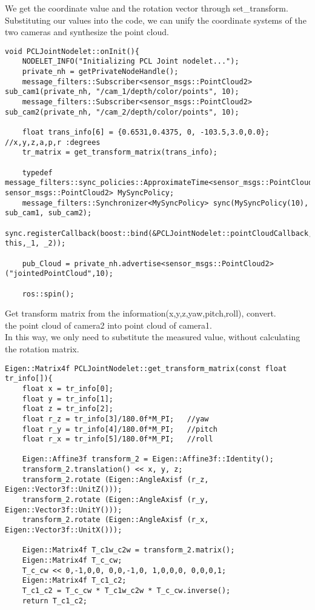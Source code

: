 We get the coordinate value and the rotation vector through set\_transform. Substituting our values into the code, we can unify the coordinate systems of the two cameras and synthesize the point cloud.
\begin{lstlisting}[caption={}]
void PCLJointNodelet::onInit(){
	NODELET_INFO("Initializing PCL Joint nodelet...");
	private_nh = getPrivateNodeHandle();
	message_filters::Subscriber<sensor_msgs::PointCloud2> sub_cam1(private_nh, "/cam_1/depth/color/points", 10);
	message_filters::Subscriber<sensor_msgs::PointCloud2> sub_cam2(private_nh, "/cam_2/depth/color/points", 10);
	
	float trans_info[6] = {0.6531,0.4375, 0, -103.5,3.0,0.0};  //x,y,z,a,p,r :degrees
	tr_matrix = get_transform_matrix(trans_info);
	
	typedef message_filters::sync_policies::ApproximateTime<sensor_msgs::PointCloud2, sensor_msgs::PointCloud2> MySyncPolicy;
	message_filters::Synchronizer<MySyncPolicy> sync(MySyncPolicy(10), sub_cam1, sub_cam2);
	sync.registerCallback(boost::bind(&PCLJointNodelet::pointCloudCallback, this,_1, _2));
	
	pub_Cloud = private_nh.advertise<sensor_msgs::PointCloud2>("jointedPointCloud",10);
	
	ros::spin();
\end{lstlisting}

Get transform matrix from the information(x,y,z,yaw,pitch,roll), convert.\\
the point cloud of camera2 into point cloud of camera1.\\
In this way, we only need to substitute the measured value, without calculating the rotation matrix.\\

\begin{lstlisting}[caption={}]
Eigen::Matrix4f PCLJointNodelet::get_transform_matrix(const float tr_info[]){
	float x = tr_info[0];
	float y = tr_info[1];
	float z = tr_info[2];
	float r_z = tr_info[3]/180.0f*M_PI;   //yaw
	float r_y = tr_info[4]/180.0f*M_PI;   //pitch
	float r_x = tr_info[5]/180.0f*M_PI;   //roll
	
	Eigen::Affine3f transform_2 = Eigen::Affine3f::Identity();
	transform_2.translation() << x, y, z;
	transform_2.rotate (Eigen::AngleAxisf (r_z, Eigen::Vector3f::UnitZ()));
	transform_2.rotate (Eigen::AngleAxisf (r_y, Eigen::Vector3f::UnitY()));
	transform_2.rotate (Eigen::AngleAxisf (r_x, Eigen::Vector3f::UnitX()));
	
	Eigen::Matrix4f T_c1w_c2w = transform_2.matrix();
	Eigen::Matrix4f T_c_cw;
	T_c_cw << 0,-1,0,0, 0,0,-1,0, 1,0,0,0, 0,0,0,1;
	Eigen::Matrix4f T_c1_c2;
	T_c1_c2 = T_c_cw * T_c1w_c2w * T_c_cw.inverse();
	return T_c1_c2;
\end{lstlisting}



